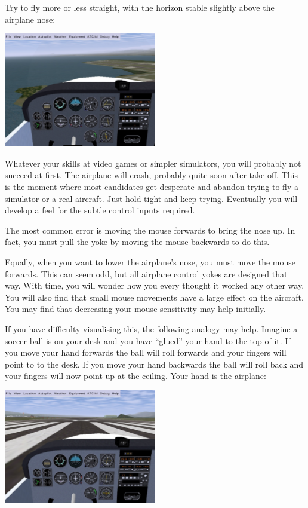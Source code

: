 Try to fly more or less straight, with the horizon stable slightly above the 
airplane nose:

\begin{center}
\includegraphics[width=0.5\textwidth]{img/tut_15}
\end{center}

Whatever your skills at video games or simpler simulators, you will probably 
not succeed at first. The airplane will crash, probably quite soon after 
take-off. This is the moment where most candidates get desperate and abandon 
trying to fly a simulator or a real aircraft. Just hold tight and keep trying. 
Eventually you will develop a feel for the subtle control inputs required.

The most common error is moving the mouse forwards to bring the nose up. In
fact, you must pull the yoke by moving the mouse backwards to do this. 

Equally, when you want to lower the airplane's nose, you must move
the mouse forwards. This can seem odd, but all airplane control yokes
are designed that way. With time, you will wonder how you every thought it
worked any other way.  You will also find that 
small mouse movements have a large effect on the aircraft. You may find that
decreasing your mouse sensitivity may help initially.

If you have difficulty visualising this, the following analogy may help.
Imagine a soccer ball is on your desk and you have ``glued'' your hand 
to the top of it. If you move your hand forwards the ball will roll forwards 
and your fingers will point to to the desk. If you move your hand backwards the 
ball will roll  back and your fingers will now point up at the ceiling. 
Your hand is the airplane:


\begin{center}
\includegraphics[width=0.5\textwidth]{img/tut_6}
\end{center}

